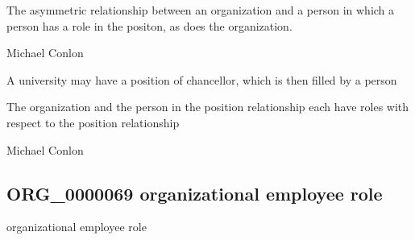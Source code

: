 \documentclass[letterpaper,10pt,english]{sphinxmanual}
\begin{document}
\begin{sphinxShadowBox}

\sphinxAtStartPar
The asymmetric relationship between an organization and a person in which a person has a role in the positon, as does the organization.
\end{sphinxShadowBox}

\begin{sphinxShadowBox}

\sphinxAtStartPar
Michael Conlon 
\end{sphinxShadowBox}

\begin{sphinxShadowBox}

\sphinxAtStartPar
A university may have a position of chancellor, which is then filled by a person
\end{sphinxShadowBox}

\begin{sphinxShadowBox}

\sphinxAtStartPar
The organization and the person in the position relationship each have roles with respect to the position relationship
\end{sphinxShadowBox}

\begin{sphinxShadowBox}

\sphinxAtStartPar
{}
\end{sphinxShadowBox}

\begin{sphinxShadowBox}

\sphinxAtStartPar
Michael Conlon 
\end{sphinxShadowBox}
\begin{quote}

\ignorespaces \end{quote}


\subsection{ORG\_0000069 \sphinxhyphen{} organizational employee role}
\label{\detokenize{doc-ORG_0000069:org-0000069-organizational-employee-role}}\label{\detokenize{doc-ORG_0000069:index-0}}\label{\detokenize{doc-ORG_0000069::doc}}
\begin{sphinxShadowBox}

\sphinxAtStartPar
organizational employee role
\end{sphinxShadowBox}
\end{document}
